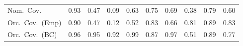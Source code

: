 \begin{table}[!htbp]
{\begin{tabular}{lrrrrrrrrr}
\quad Nom.\ Cov. & \cellcolor{rankone}0.93 & 0.47 & 0.09 & 0.63 & \cellcolor{rankthree}0.75 & 0.69 & 0.38 & \cellcolor{ranktwo}0.79 & 0.60 \\
\quad Orc.\ Cov.\ (Emp) & \cellcolor{rankone}0.90 & 0.47 & 0.12 & 0.52 & \cellcolor{rankthree}0.83 & 0.66 & 0.81 & \cellcolor{ranktwo}0.89 & \cellcolor{rankthree}0.83 \\
\quad Orc.\ Cov.\ (BC) & \cellcolor{ranktwo}0.96 & \cellcolor{rankone}0.95 & 0.92 & 0.99 & 0.87 & \cellcolor{rankthree}0.97 & 0.51 & 0.89 & 0.77 \\
\bottomrule
\end{tabular}}
\end{table}
